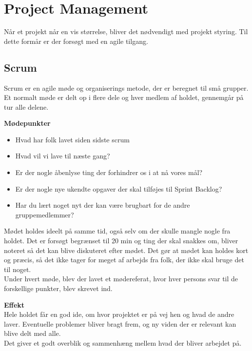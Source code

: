 \newpage
\section{Project Management}

Når et projekt når en vis størrelse, bliver det nødvendigt med projekt styring. Til dette formår er der forsøgt med en agile tilgang.\\


\subsection{Scrum}

Scrum er en agile møde og organiserings metode, der er beregnet til små grupper. Et normalt møde er delt op i flere dele og hver medlem af holdet, gennemgår på tur alle delene.

\textbf{Mødepunkter}
\begin{itemize}
	\item Hvad har folk lavet siden sidste scrum
	\item Hvad vil vi lave til næste gang?
	\item Er der nogle åbenlyse ting der forhindrer os i at nå vores mål?
	\item Er der nogle nye ukendte opgaver der skal tilføjes til Sprint Backlog?
	\item Har du lært noget nyt der kan være brugbart for de andre gruppemedlemmer?
\end{itemize}

Mødet holdes ideelt på samme tid, også selv om der skulle mangle nogle fra holdet. Det er forsøgt begrænset til 20 min og ting der skal snakkes om, bliver noteret så det kan blive diskuteret efter mødet.
Det gør at mødet kan holdes kort og præcis, så det ikke tager for meget af arbejds fra folk, der ikke skal bruge det til noget.\\

Under hvert møde, blev der lavet et mødereferat, hvor hver persons svar til de forskellige punkter, blev skrevet ind.




\textbf{Effekt}\\

Hele holdet får en god ide, om hvor projektet er på vej hen og hvad de andre laver. Eventuelle problemer bliver bragt frem, og ny viden der er relevant kan blive delt med alle.\\
Det giver et godt overblik og sammenhæng mellem hvad der bliver arbejdet på.


